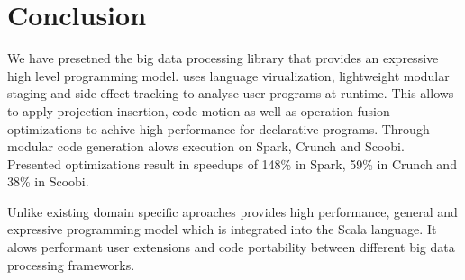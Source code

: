 \section{Conclusion}
\label{sec:conclusion}

We have presetned the big data processing library \tool that provides an expressive high level programming model. \tool uses language virualization, lightweight modular staging and side effect tracking to analyse user programs at runtime. This allows \tool to apply projection insertion, code motion as well as operation fusion optimizations to achive high performance for declarative programs. Through modular code generation \tool alows execution on Spark, Crunch and Scoobi. Presented optimizations result in speedups of 148\% in Spark, 59\% in Crunch and 38\% in Scoobi.   

Unlike existing domain specific aproaches \tool provides high performance, general and expressive programming model which is integrated into the Scala language. It alows performant user extensions and code portability between different big data processing frameworks.  